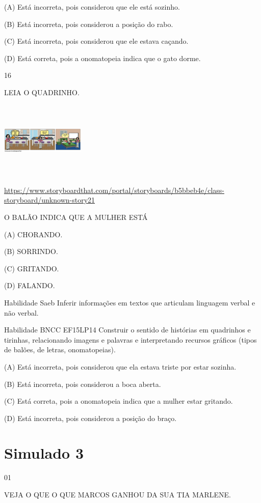 {{{{{{(A) Está incorreta, pois considerou que ele está sozinho.

(B) Está incorreta, pois considerou a posição do rabo.

(C) Está incorreta, pois considerou que ele estava caçando.

(D) Está correta, pois a onomatopeia indica que o gato dorme.

\num{16}

LEIA O QUADRINHO.

\includegraphics[width=1.57333in,height=1.45456in]{media/image162.png}

\url{https://www.storyboardthat.com/portal/storyboards/b5bbeb4e/class-storyboard/unknown-story21}

O BALÃO INDICA QUE A MULHER ESTÁ

(A) CHORANDO.

(B) SORRINDO.

(C) GRITANDO.

(D) FALANDO.

Habilidade Saeb Inferir informações em textos que articulam linguagem
verbal e não verbal.

Habilidade BNCC EF15LP14 Construir o sentido de histórias em quadrinhos
e tirinhas, relacionando imagens e palavras e interpretando recursos
gráficos (tipos de balões, de letras, onomatopeias).

(A) Está incorreta, pois considerou que ela estava triste por estar
sozinha.

(B) Está incorreta, pois considerou a boca aberta.

(C) Está correta, pois a onomatopeia indica que a mulher estar gritando.

(D) Está incorreta, pois considerou a posição do braço.

\chapter{Simulado 3}

\num{01}

VEJA O QUE O QUE MARCOS GANHOU DA SUA TIA MARLENE.

}}}}}}
